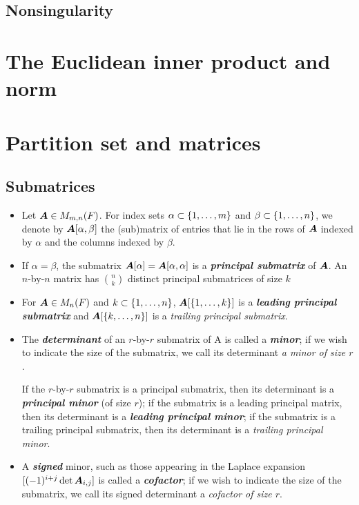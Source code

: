 \documentclass[11pt]{article}
\begin{document}
\subsection{Nonsingularity}

\section{The Euclidean inner product and norm}

\section{Partition set and matrices}
\subsection{Submatrices}
\begin{itemize}
\item Let $\boldsymbol{A} \in M_{m, n}(F)$. For index sets $\alpha \subset \left\{1,\ldots, m\right\}$ and $\beta \subset \left\{1,\ldots,n\right\}$, we denote by $\boldsymbol{A}[\alpha, \beta]$ the (sub)matrix of entries that lie in the rows of $\boldsymbol{A}$ indexed by $\alpha$ and the columns indexed by $\beta$. 

\item If $\alpha = \beta$, the submatrix $\boldsymbol{A}[\alpha] = \boldsymbol{A}[\alpha, \alpha]$ is a \emph{\textbf{principal submatrix}} of  $\boldsymbol{A}$. An $n$-by-$n$  matrix has $n \choose k$ distinct principal submatrices of size $k$

\item For $\boldsymbol{A} \in M_{n}(F)$ and $k \subset \left\{1,\ldots,n\right\}$, $\boldsymbol{A}[\left\{1,\ldots,k\right\}]$ is a \emph{\textbf{leading principal submatrix}} and $\boldsymbol{A}[\left\{k,\ldots,n\right\}]$ is a \emph{trailing principal submatrix}.

\item The \emph{\textbf{determinant}} of an $r$-by-$r$ submatrix of A is called a \emph{\textbf{minor}}; if we wish to
indicate the size of the submatrix, we call its determinant \emph{a minor of size $r$}.

If the $r$-by-$r$  submatrix is a principal submatrix, then its determinant is a \emph{\textbf{principal minor}} (of size $r$); if the submatrix is a leading principal matrix, then its determinant is a \emph{\textbf{leading principal minor}}; if the submatrix is a trailing principal submatrix, then its determinant is a \emph{trailing principal minor}.

\item A \emph{\textbf{signed}} minor, such as those appearing in the Laplace expansion $[(-1)^{i+ j} \det \boldsymbol{A}_{i,j}]$ is called a \emph{\textbf{cofactor}}; if we wish to indicate the size of the submatrix, we call its signed determinant a \emph{cofactor of size $r$}.


\end{itemize}
\end{document}
